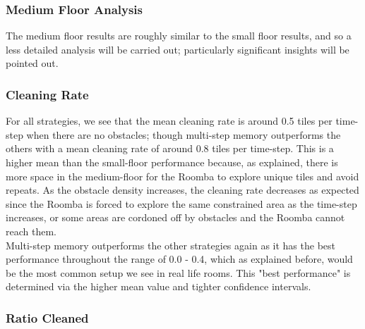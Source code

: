 \documentclass[11pt]{article}
\begin{document}
    
    \begin{center}
    \end{center}

    
    \begin{center}
    \end{center}

    
    \subsubsection{Medium Floor Analysis}

The medium floor results are roughly similar to the small floor results,
and so a less detailed analysis will be carried out; particularly
significant insights will be pointed out.

\subsubsection*{Cleaning Rate}

For all strategies, we see that the mean cleaning rate is around 0.5
tiles per time-step when there are no obstacles; though multi-step
memory outperforms the others with a mean cleaning rate of around 0.8
tiles per time-step. This is a higher mean than the small-floor
performance because, as explained, there is more space in the
medium-floor for the Roomba to explore unique tiles and avoid repeats.
As the obstacle density increases, the cleaning rate decreases as
expected since the Roomba is forced to explore the same constrained area
as the time-step increases, or some areas are cordoned off by obstacles
and the Roomba cannot reach them.\\

Multi-step memory outperforms the other strategies again as it has the
best performance throughout the range of 0.0 - 0.4, which as explained
before, would be the most common setup we see in real life rooms. This
"best performance" is determined via the higher mean value and tighter
confidence intervals.

\subsubsection*{Ratio Cleaned}
\end{document}
